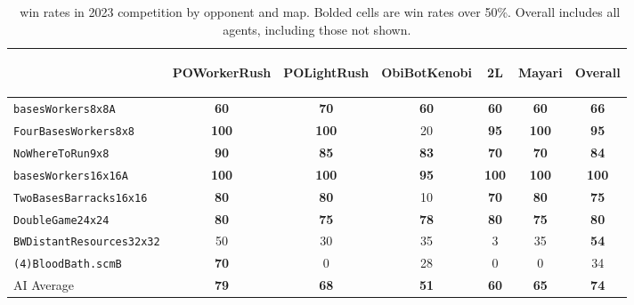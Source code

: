 \documentclass[conference]{IEEEtran}
\begin{document}
\begin{table}[ht]
    \caption{\agentName\ win rates in 2023 competition by opponent and map. Bolded cells are win rates over 50\%. Overall includes all agents, including those not shown.}
    \label{tab:competition-winrate-by-map}
    \begin{center}
    \begin{tabular}{lccccc|c}
    & \begin{sideways}POWorkerRush\end{sideways} & \begin{sideways}POLightRush\end{sideways} & \begin{sideways}ObiBotKenobi\end{sideways} & \begin{sideways}2L\end{sideways} & \begin{sideways}Mayari\end{sideways} & \begin{sideways}Overall\end{sideways}\\ 
    \midrule
    \texttt{basesWorkers8x8A} & \textbf{60} & \textbf{70} & \textbf{60} & \textbf{60} & \textbf{60} & \textbf{66}\\ 
    \texttt{FourBasesWorkers8x8} & \textbf{100} & \textbf{100} & 20 & \textbf{95} & \textbf{100} & \textbf{95}\\ 
    \texttt{NoWhereToRun9x8} & \textbf{90} & \textbf{85} & \textbf{83} & \textbf{70} & \textbf{70} & \textbf{84}\\
    \texttt{basesWorkers16x16A} & \textbf{100} & \textbf{100} & \textbf{95} & \textbf{100} & \textbf{100} & \textbf{100}\\
    \texttt{TwoBasesBarracks16x16} & \textbf{80} & \textbf{80} & 10 & \textbf{70} & \textbf{80} & \textbf{75}\\
    \texttt{DoubleGame24x24} & \textbf{80} & \textbf{75} & \textbf{78} & \textbf{80} & \textbf{75} & \textbf{80}\\ 
    \texttt{BWDistantResources32x32} & 50 & 30 & 35 & 3 & 35 & \textbf{54}\\
    \texttt{(4)BloodBath.scmB} & \textbf{70} & 0 & 28 & 0 & 0 & 34\\ 
    \hline
    AI Average & \textbf{79} & \textbf{68} & \textbf{51} & \textbf{60} & \textbf{65} & \textbf{74}\\ 
    \end{tabular}
    \end{center}
\end{table}
\end{document}
